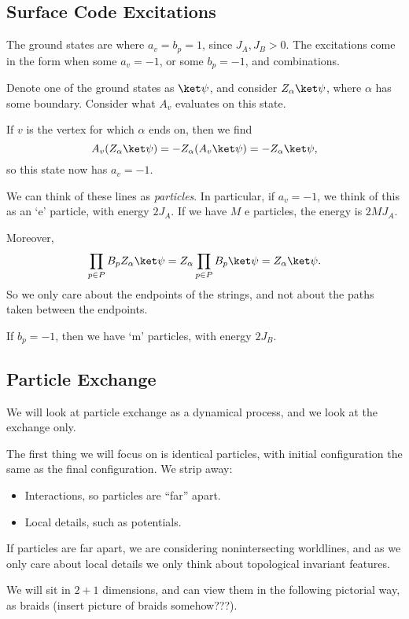 \documentclass[12pt]{article}
\begin{document}
\subsection{Surface Code Excitations}%
\label{sub:sce}

The ground states are where $a_v = b_p = 1$, since $J_A, J_B > 0$. The excitations come in the form when some $a_v = -1$, or some $b_p = -1$, and combinations.

Denote one of the ground states as $\ket \psi$, and consider $Z_\alpha \ket \psi$, where $\alpha$ has some boundary. Consider what $A_v$ evaluates on this state.

If $v$ is the vertex for which $\alpha$ ends on, then we find
\[
A_v (Z_\alpha \ket \psi) = - Z_\alpha (A_v \ket \psi) = - Z_\alpha \ket \psi,
\]
so this state now has $a_v = -1$.

We can think of these lines as \emph{particles}. In particular, if $a_v = -1$, we think of this as an `e' particle, with energy $2 J_A$. If we have $M$ e particles, the energy is $2M J_A$.

Moreover,
\[
\prod_{p \in P} B_p Z_\alpha \ket \psi = Z_\alpha \prod_{p \in P} B_p \ket \psi = Z_\alpha \ket \psi.
\]
So we only care about the endpoints of the strings, and not about the paths taken between the endpoints.

If $b_p = -1$, then we have `m' particles, with energy $2 J_B$.

\subsection{Particle Exchange}%
\label{sub:pe}

We will look at particle exchange as a dynamical process, and we look at the exchange only.

The first thing we will focus on is identical particles, with initial configuration the same as the final configuration. We strip away:
\begin{itemize}
	\item Interactions, so particles are ``far'' apart.
	\item Local details, such as potentials.
\end{itemize}
If particles are far apart, we are considering nonintersecting worldlines, and as we only care about local details we only think about topological invariant features.

We will sit in $2 + 1$ dimensions, and can view them in the following pictorial way, as braids (insert picture of braids somehow???).
\end{document}
